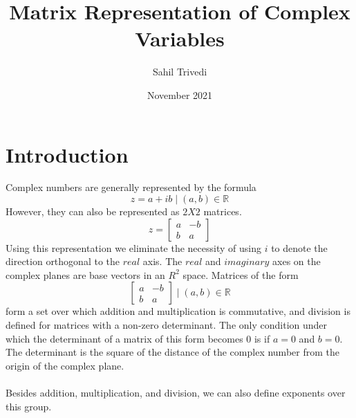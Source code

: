 \documentclass[12pt]{article}
\date{November 2021}
\title{Matrix Representation of Complex Variables}
\author{Sahil Trivedi}
\begin{document}
    \maketitle

    \section{Introduction}
    Complex numbers are generally represented by the formula
    $$z = a + ib \mid (a,b) \in \mathbb{R}  $$
    However, they can also be represented as $2 X 2$ matrices.
    $$z = \begin{bmatrix}
        a & -b \\
        b & a 
    \end{bmatrix}$$
    Using this representation we eliminate the necessity of using $i$ to denote the direction orthogonal to the $real$ axis. The $real$ and $imaginary$ axes on the complex planes are base vectors in an $R^2$ space.
    Matrices of the form
    $$\begin{bmatrix}
        a & -b \\
        b & a 
    \end{bmatrix}  \mid (a,b) \in \mathbb{R} $$
    form a set over which addition and multiplication is commutative, and division is defined for matrices with a non-zero determinant. The only condition under which the determinant of a matrix of this form becomes $0$ is if $a=0$ and $b=0$. The determinant is the square of the distance of the complex number from the origin of the complex plane. 
    \\\\
    Besides addition, multiplication, and division, we can also define exponents over this group.
\end{document}
